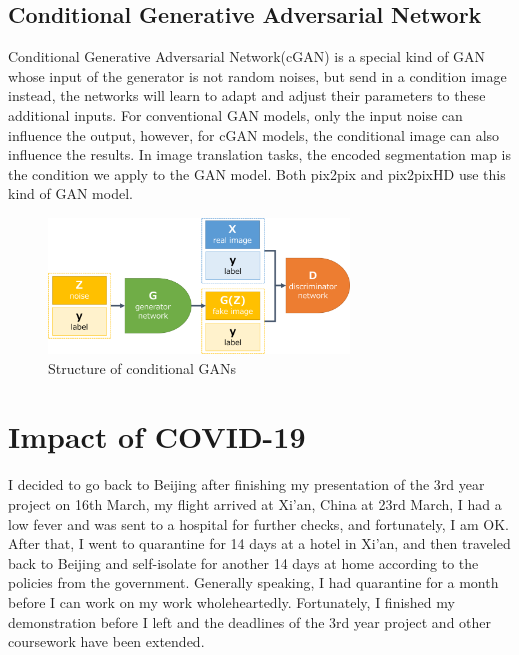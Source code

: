\subsection{Conditional Generative Adversarial Network}
Conditional Generative Adversarial Network(cGAN) is a special kind of GAN whose input 
of the generator is not random noises, but send in a condition image instead, the networks will learn 
to adapt and adjust their parameters to these additional inputs. For conventional GAN models, 
only the input noise can influence the output, however, for cGAN models, the conditional image can 
also influence the results. In image translation tasks, the encoded segmentation map is the condition 
we apply to the GAN model. Both pix2pix\cite{pix2pix2016} and pix2pixHD\cite{wang2018pix2pixHD} use 
this kind of GAN model.
\begin{figure}[H]
    \begin{center}
    \includegraphics[width=8cm]{figures/cGANs}
    \end{center}
    \caption{Structure of conditional GANs}
    \label{fig:cGANs-structure}
\end{figure}

\section{Impact of COVID-19}
I decided to go back to Beijing after finishing my presentation of the 3rd year project on 16th March, 
my flight arrived at Xi'an, China at 23rd March, 
I had a low fever and was sent to a hospital for further checks, and fortunately, I am OK. 
After that, I went to quarantine for 14 days at a hotel in Xi'an, and then traveled back to Beijing and 
self-isolate for another 14 days at home according to the policies from the government. Generally speaking, I 
had quarantine for a month before I can work on my work wholeheartedly. Fortunately, I finished my demonstration 
before I left and the deadlines of the 3rd year project and other coursework have been extended.



